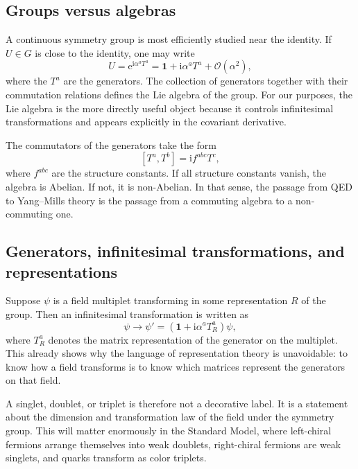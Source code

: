 \documentclass[11pt,a4paper]{article}
\newcommand{\ii}{\mathrm{i}}
\newcommand{\ee}{\mathrm{e}}
\newcommand{\comm}[2]{\left[#1,#2\right]}
\newcommand{\mc}[1]{\mathcal{#1}}
\begin{document}
\subsection{Groups versus algebras}

A continuous symmetry group is most efficiently studied near the identity. If \(U\in G\) is close to the identity, one may write
\begin{equation}
U=\ee^{\ii\alpha^aT^a}=\mathbf{1}+\ii\alpha^aT^a+\mc{O}(\alpha^2),
\label{eq:group-element-near-identity}
\end{equation}
where the \(T^a\) are the generators. The collection of generators together with their commutation relations defines the Lie algebra of the group. For our purposes, the Lie algebra is the more directly useful object because it controls infinitesimal transformations and appears explicitly in the covariant derivative.

The commutators of the generators take the form
\begin{equation}
\comm{T^a}{T^b}=\ii f^{abc}T^c,
\label{eq:lie-algebra-commutator-expanded}
\end{equation}
where \(f^{abc}\) are the structure constants. If all structure constants vanish, the algebra is Abelian. If not, it is non-Abelian. In that sense, the passage from QED to Yang--Mills theory is the passage from a commuting algebra to a non-commuting one.

\subsection{Generators, infinitesimal transformations, and representations}

Suppose \(\psi\) is a field multiplet transforming in some representation \(R\) of the group. Then an infinitesimal transformation is written as
\begin{equation}
\psi\to \psi'=(\mathbf{1}+\ii\alpha^aT^a_R)\psi,
\label{eq:infinitesimal-transformation-rep}
\end{equation}
where \(T^a_R\) denotes the matrix representation of the generator on the multiplet. This already shows why the language of representation theory is unavoidable: to know how a field transforms is to know which matrices represent the generators on that field.

A singlet, doublet, or triplet is therefore not a decorative label. It is a statement about the dimension and transformation law of the field under the symmetry group. This will matter enormously in the Standard Model, where left-chiral fermions arrange themselves into weak doublets, right-chiral fermions are weak singlets, and quarks transform as color triplets.
\end{document}
